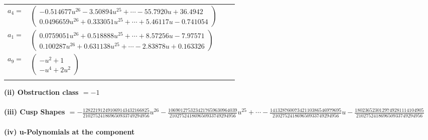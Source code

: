 \documentclass[1p]{elsarticle_modified}
\theoremstyle{definition}
\begin{document}
\begin{tabular}{m{7pt} m{180pt} m{7pt} m{180pt} }
\flushright $a_{4}=$&$\begin{pmatrix}-0.514677 u^{26}-3.50894 u^{25}+\cdots-55.7920 u+36.4942\\0.0496659 u^{26}+0.333051 u^{25}+\cdots+5.46117 u-0.741054\end{pmatrix}$ \\
\flushright $a_{1}=$&$\begin{pmatrix}0.0759051 u^{26}+0.518888 u^{25}+\cdots+8.57256 u-7.97571\\0.100287 u^{26}+0.631138 u^{25}+\cdots-2.83878 u+0.163326\end{pmatrix}$ \\
\flushright $a_{9}=$&$\begin{pmatrix}- u^2+1\\- u^4+2 u^2\end{pmatrix}$\\&\end{tabular}
\flushleft \textbf{(ii) Obstruction class $= -1$}\\~\\
\flushleft \textbf{(iii) Cusp Shapes $= -\frac{128221912491069143432166825}{210275241869650933749294956} u^{26}-\frac{1069012753234217659630964039}{210275241869650933749294956} u^{25}+\cdots-\frac{14132876007342110386546979695}{210275241869650933749294956} u-\frac{1802365230129749281114104905}{210275241869650933749294956}$}\\~\\
\newpage\renewcommand{\arraystretch}{1}
\flushleft \textbf{(iv) u-Polynomials at the component}\newline \\
\end{document}
